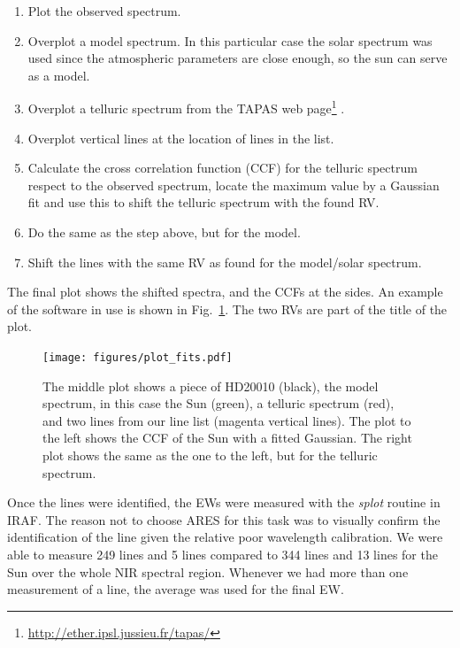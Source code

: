 \documentclass{aa}
\begin{document}
\begin{enumerate}
    \item Plot the observed spectrum.
    \item Overplot a model spectrum. In this particular case the solar spectrum was
        used since the atmospheric parameters are close enough, so the sun can
        serve as a model.
    \item Overplot a telluric spectrum from the TAPAS web
          page\footnote{\url{http://ether.ipsl.jussieu.fr/tapas/}} \citep{Bertaux2014}.
    \item Overplot vertical lines at the location of lines in the list.
    \item Calculate the cross correlation function (CCF) for the telluric spectrum
        respect to the observed spectrum, locate the maximum value by a Gaussian fit
        and use this to shift the telluric spectrum with the found RV.
    \item Do the same as the step above, but for the model.
    \item Shift the lines with the same RV as found for the model/solar spectrum.
\end{enumerate}
The final plot shows the shifted spectra, and the CCFs at the sides. An
example of the software in use is shown in Fig.~\ref{fig:plot_fits}. The
two RVs are part of the title of the plot.

\begin{figure}[tbp!]
    \centering
    \texttt{[image: figures/plot\_fits.pdf]}
    \caption{The middle plot shows a piece of HD20010 (black), the model
    spectrum, in this case the Sun (green), a telluric spectrum (red),
    and two lines from our line list (magenta vertical lines). The
    plot to the left shows the CCF of the Sun with a fitted Gaussian.
    The right plot shows the same as the one to the left, but for the
    telluric spectrum.}
    \label{fig:plot_fits}
\end{figure}

Once the lines were identified, the EWs were measured with the \emph{splot}
routine in IRAF. The reason not to choose ARES for this task was to
visually confirm the identification of the line given the relative
poor wavelength calibration. We were able to measure 249
 lines and 5  lines compared to 344 
lines and 13  lines for the Sun over the whole NIR spectral
region. Whenever we had more than one measurement of a line, the average
was used for the final EW.
\end{document}
